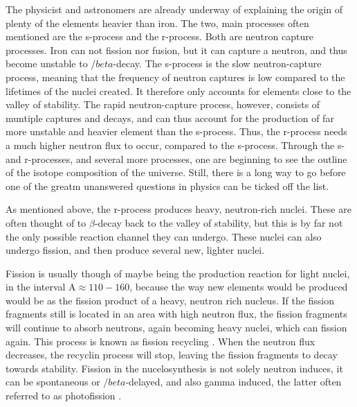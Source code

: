 \documentclass[]{article}
\begin{document}
The physicist and astronomers are already underway of explaining the origin of plenty of the elements heavier than iron. The two, main processes often mentioned are the s-process and the r-process. Both are neutron capture processes. Iron can not fission nor fusion, but it can capture a neutron, and thus become unstable to $/beta$-decay. The s-process is the slow neutron-capture process, meaning that the frequency of neutron captures is low compared to the lifetimes of the nuclei created. It therefore only accounts for elements close to the valley of stability. The rapid neutron-capture process, however, consists of muntiple captures and decays, and can thus account for the production of far more unstable and heavier element than the s-process. Thus, the r-process needs a much higher neutron flux to occur, compared to the s-process. Through the s- and r-processes, and several more processes, one are beginning to see the outline of the isotope composition of the universe. Still, there is a long way to go before one of the greatm unanswered questions in physics can be ticked off the list.

\par 
\vspace{3mm}

As mentioned above, the r-process produces heavy, neutron-rich nuclei. These are often thought of to $\beta$-decay back to the valley of stability, but this is by far not the only possible reaction channel they can undergo. These nuclei can also undergo fission, and then produce several new, lighter nuclei.

Fission is usually though of maybe being the production reaction for light nuclei, in the interval A$\approx 110 - 160$, because the way new elements would be produced would be as the fission product of a heavy, neutron rich nucleus. If the fission fragments still is located in an area with high neutron flux, the fission fragments will continue to absorb neutrons, again becoming heavy nuclei, which can fission again. This process is known as fission recycling \cite{Goriely2017}. When the neutron flux decreases, the recyclin process will stop, leaving the fission fragments to decay towards stability. Fission in the nucelosynthesis is not solely neutron induces, it can be spontaneous or $/beta$-delayed, and also gamma induced, the latter often referred to as photofission \cite{Goriely2017}. 

\par 
\vspace{3mm}
\end{document}

